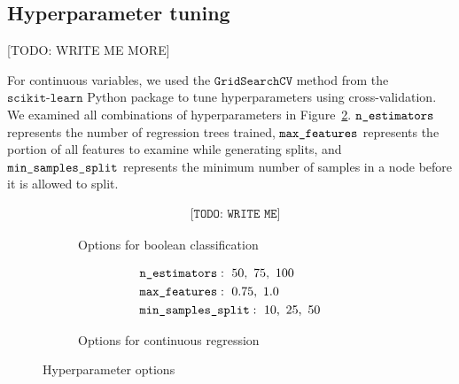 \documentclass{article} %
\begin{document}

\subsection{Hyperparameter tuning}
\label{sec:hyperparametertuning}

[TODO: WRITE ME MORE]

For continuous variables, we used the $\texttt{GridSearchCV}$ method from the $\texttt{scikit-learn}$ Python package to tune hyperparameters using cross-validation. We examined all combinations of hyperparameters in Figure~\ref{fig:contparams}. $\texttt{n\textunderscore estimators}$ represents the number of regression trees trained, $\texttt{max\textunderscore features}$ represents the portion of all features to examine while generating splits, and $\texttt{min\textunderscore samples\textunderscore split}$ represents the minimum number of samples in a node before it is allowed to split.

\begin{figure}[H]
  \centering
  \begin{subfigure}[b]{0.35\textwidth}
    \begin{align*}
      &\texttt{[TODO: WRITE~ME]}
    \end{align*}
    \caption{Options for boolean classification}
    \label{fig:boolparams}
  \end{subfigure}
  \hfill
  \begin{subfigure}[b]{0.35\textwidth}
    \begin{align*}
      &\texttt{n\textunderscore estimators}:~50,~75,~100\\
      &\texttt{max\textunderscore features}:~0.75,~1.0\\
      &\texttt{min\textunderscore samples\textunderscore split}:~10,~25,~50
    \end{align*}
    \caption{Options for continuous regression}
    \label{fig:contparams}
  \end{subfigure}
  \caption{Hyperparameter options}
  \label{fig:params}
\end{figure}
\end{document}
